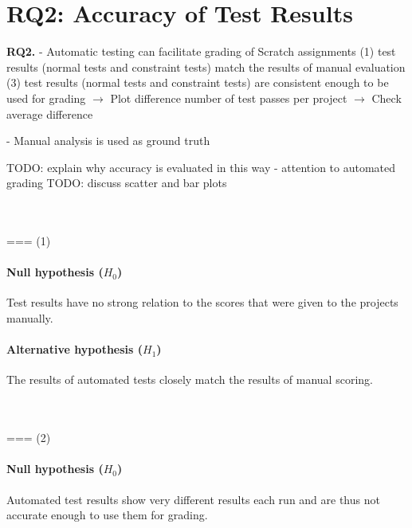 \section{RQ2: Accuracy of Test Results}

\textbf{RQ2.}
- Automatic testing can facilitate grading of Scratch assignments
    (1) test results (normal tests and constraint tests) match the results of manual evaluation
    (3) test results (normal tests and constraint tests) are consistent enough to be used for grading
        $\rightarrow$ Plot difference number of test passes per project
        $\rightarrow$ Check average difference

- Manual analysis is used as ground truth

TODO: explain why accuracy is evaluated in this way
    - attention to automated grading
TODO: discuss scatter and bar plots

~\\~\\
=== (1)
\paragraph{Null hypothesis ($H_0$)}
Test results have no strong relation to the scores that were given to the projects manually.
\paragraph{Alternative hypothesis ($H_1$)}
The results of automated tests closely match the results of manual scoring.

~\\~\\
=== (2)
\paragraph{Null hypothesis ($H_0$)}
Automated test results show very different results each run and are thus not accurate enough to use them for grading.
